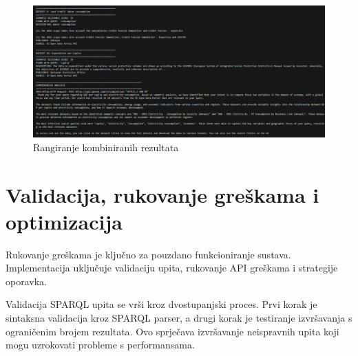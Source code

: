 \begin{figure}[htbp]
    \centering
    \includegraphics[width=1\textwidth]{figures/ranking_combined_results2.png}
    \caption{Rangiranje kombiniranih rezultata}
    \label{fig:unified_data_assistant}
\end{figure}

\section{Validacija, rukovanje greškama i optimizacija}

Rukovanje greškama je ključno za pouzdano funkcioniranje sustava. Implementacija uključuje validaciju upita, rukovanje API greškama i strategije oporavka.

Validacija SPARQL upita se vrši kroz dvostupanjski proces. Prvi korak je sintaksna validacija kroz SPARQL parser, a drugi korak je testiranje izvršavanja s ograničenim brojem rezultata. Ovo sprječava izvršavanje neispravnih upita koji mogu uzrokovati probleme s performansama.

